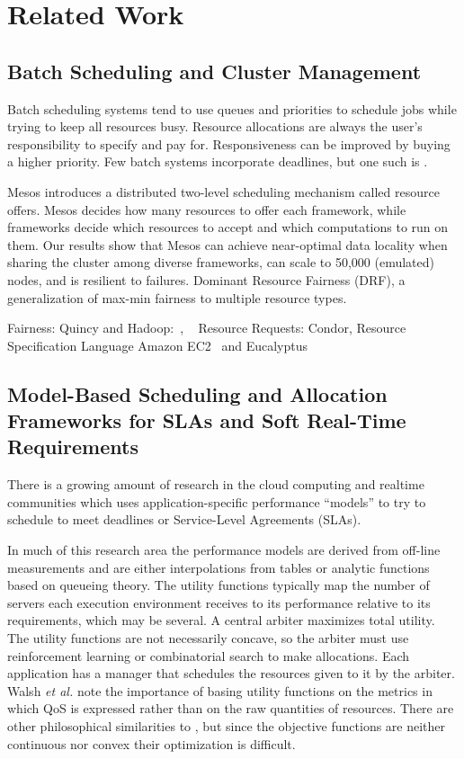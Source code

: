 \section{Related Work}\label{related_work}
\subsection{Batch Scheduling and Cluster Management}
Batch scheduling systems\cite{Feit97,FRS04} tend to use queues and priorities to schedule jobs while trying to keep all resources busy.
Resource allocations are always the user's responsibility to specify and pay for.
Responsiveness can be improved by buying a higher priority.
Few batch systems incorporate deadlines, but one such is \cite{AKKMS95}.

\cite{FeRu92}
\cite{mesos}
Mesos introduces a distributed two-level scheduling mechanism called resource offers. Mesos decides how many resources to offer each framework, while frameworks decide which resources to accept and which computations to run on them. Our results show that Mesos can achieve near-optimal data locality when sharing the cluster among diverse frameworks, can scale to 50,000 (emulated) nodes, and is resilient to failures.
\cite{mesos-DRF} Dominant Resource Fairness (DRF), a generalization of max-min fairness to multiple resource types.

Fairness:
Quincy and Hadoop:~\cite{Quincy}, ~\cite{hadoop_fair, hadoop_cap, hadoop_matei}
Resource Requests:
Condor, Resource Specification Language\cite{Condor}
Amazon EC2~\cite{EC2} and Eucalyptus~\cite{eucalyptus}

\subsection{Model-Based Scheduling and Allocation Frameworks for SLAs and Soft Real-Time Requirements}

There is a growing amount of research in the cloud computing and realtime communities which uses application-specific performance ``models'' to try to schedule to meet deadlines or Service-Level Agreements (SLAs).



In much of this research area\cite{1078472,1078493,1285843,1345325}
the performance models are derived from off-line measurements and are either
interpolations from tables or analytic functions based on queueing theory.
The utility functions typically map the number of servers each execution environment receives
to its performance relative to its requirements, which may be several.
A central arbiter maximizes total utility. The utility functions are not necessarily concave,
so the arbiter must use reinforcement learning or combinatorial search to make allocations.
Each application has a manager that schedules the resources given to it by the arbiter.
%
Walsh \emph{et al.}\cite{1078411} note the importance of basing utility functions
on the metrics in which QoS is expressed rather than on the raw quantities of resources.
There are other philosophical similarities to \pacora,
but since the objective functions are neither continuous nor convex their optimization is difficult.


